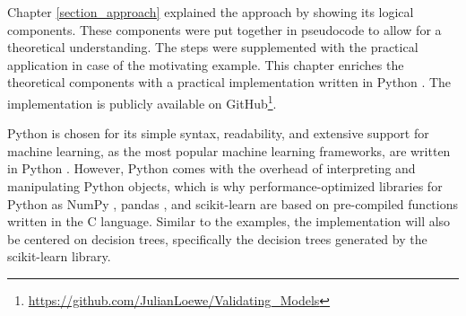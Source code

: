 Chapter \ref{section_approach}  explained the approach by showing its logical components. These components were put together in pseudocode to allow for a theoretical understanding. The steps were supplemented with the practical application in case of the motivating example. This chapter enriches the theoretical components with a practical implementation written in Python \cite{python}. The implementation is publicly available on GitHub\footnote{\href{https://github.com/JulianLoewe/Validating_Models}{https://github.com/JulianLoewe/Validating\_Models}}.

Python is chosen for its simple syntax, readability, and extensive support for machine learning, as the most popular machine learning frameworks, are written in Python \cite{state_of_data_science_2021}. However, Python comes with the overhead of interpreting and manipulating Python objects, which is why performance-optimized libraries for Python as NumPy \cite{numpy}, pandas \cite{pandas}, and scikit-learn \cite{sklearn_api,scikit-learn} are based on pre-compiled functions written in the C language. 
Similar to the examples, the implementation will also be centered on decision trees, specifically the decision trees generated by the scikit-learn library.